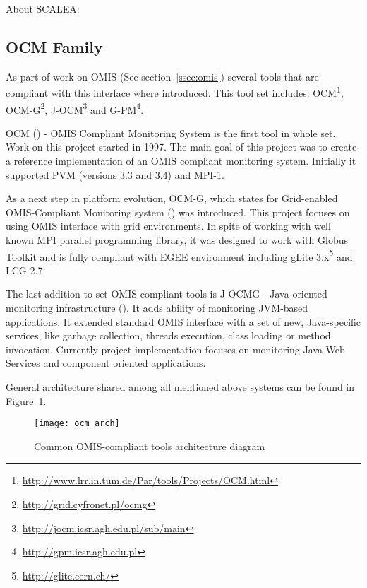 About SCALEA: \cite{SCALEA1,SCALEA2, SCALEA3}

\subsection{OCM Family}

As part of work on OMIS (See section~\ref{ssec:omis}) several tools that are compliant with this interface where introduced. This tool set includes: OCM\footnote{\url{http://www.lrr.in.tum.de/Par/tools/Projects/OCM.html}}, OCM-G\footnote{\url{http://grid.cyfronet.pl/ocmg}}, J-OCM\footnote{\url{http://jocm.icsr.agh.edu.pl/sub/main}} and G-PM\footnote{\url{http://gpm.icsr.agh.edu.pl}}.

OCM (\cite{RWspdt98, RW:ppam99b}) - OMIS Compliant Monitoring System is the first tool in whole set. Work on this project started in 1997. The main goal of this project was to create a reference implementation of an OMIS compliant monitoring system. Initially it supported PVM (versions 3.3 and 3.4) and MPI-1. 

As a next step in platform evolution, OCM-G, which states for Grid-enabled OMIS-Compliant Monitoring system (\cite{axgrid03b}) was introduced. This project focuses on using OMIS interface with grid environments.  In spite of working with well known MPI parallel programming library, it was designed to work with Globus Toolkit and is fully compliant with EGEE environment including gLite 3.x\footnote{\url{http://glite.cern.ch/}} and LCG 2.7. 

The last addition to set OMIS-compliant tools is J-OCMG - Java oriented monitoring infrastructure (\cite{jocm}). It adds ability of monitoring JVM-based applications. It extended standard OMIS interface with a set of new, Java-specific services, like garbage collection, threads execution, class loading or method invocation. Currently project implementation focuses on monitoring Java Web Services and component oriented applications.

General architecture shared among all mentioned above systems can be found in Figure~\ref{fig:ocmg}.

\begin{figure}[ht]
  \centering
  \texttt{[image: ocm\_arch]}
  \caption{Common OMIS-compliant tools architecture diagram}
  \label{fig:ocmg}
\end{figure}
 
 
 

